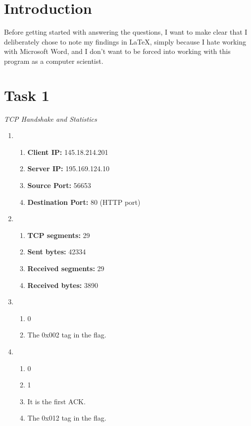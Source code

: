 \documentclass[12pt]{article}
\begin{document}
\maketitle
\section{Introduction}
Before getting started with answering the questions, I want to make clear
that I deliberately chose to note my findings in LaTeX, simply because
I hate working with Microsoft Word, and I don't want to be forced into working
with this program as a computer scientist.
\section{Task 1}
\emph{TCP Handshake and Statistics}
\begin{enumerate}
    \item
    \begin{enumerate}
        \item {\bf Client IP:} 145.18.214.201
        \item {\bf Server IP:} 195.169.124.10
        \item {\bf Source Port:} 56653
        \item {\bf Destination Port:} 80 (HTTP port)
    \end{enumerate}
    \item
    \begin{enumerate}
        \item {\bf TCP segments:} 29
        \item {\bf Sent bytes:} 42334
        \item {\bf Received segments:} 29
        \item {\bf Received bytes:} 3890
    \end{enumerate}
    \clearpage
    \item
    \begin{enumerate}
        \item 0
        \item The 0x002 tag in the flag.
    \end{enumerate}
    \item
    \begin{enumerate}
        \item 0
        \item 1
        \item It is the first ACK.
        \item The 0x012 tag in the flag.
    \end{enumerate}
\end{enumerate}
\end{document}
